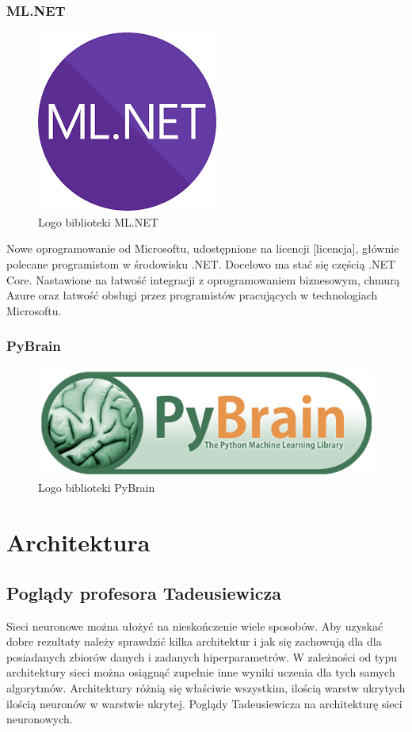 \documentclass[a4paper,twoside,titlepage,openright]{book}
\begin{document}
\subsection{ML.NET}
\begin{figure}[h]
	\centering
			\includegraphics[resolution=120]{ML.NET.png}
		\caption{Logo biblioteki ML.NET}
\end{figure}
Nowe oprogramowanie od Microsoftu, udostępnione na licencji [licencja], głównie polecane programistom w środowisku .NET. Docelowo ma stać się częścią .NET Core. Nastawione na łatwość integracji z oprogramowaniem biznesowym, chmurą Azure oraz łatwość obsługi przez programistów pracujących w technologiach Microsoftu.

\subsection{PyBrain}
\begin{figure}[h]
	\centering
			\includegraphics[resolution=120]{PyBrain.png}
		\caption{Logo biblioteki PyBrain}
\end{figure}


\chapter{Architektura}
\section{Poglądy profesora Tadeusiewicza}
Sieci neuronowe można ułożyć na nieskończenie wiele sposobów. Aby uzyskać dobre rezultaty należy sprawdzić kilka architektur i jak się zachowują dla dla posiadanych zbiorów danych i zadanych hiperparametrów.
W zależności od typu architektury sieci można osiągnąć zupełnie inne wyniki uczenia dla tych samych algorytmów. 
Architektury różnią się właściwie wszystkim, ilością warstw ukrytych ilością neuronów w warstwie ukrytej. 
Poglądy Tadeusiewicza na architekturę sieci neuronowych.
\end{document}
